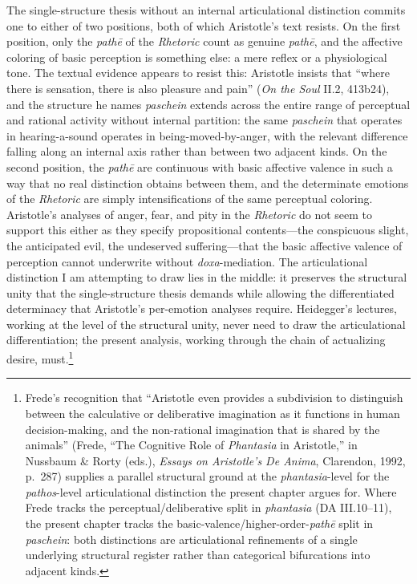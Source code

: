 \documentclass{article}
\begin{document}
The single-structure thesis without an internal articulational distinction commits one to either of two positions, both of which Aristotle's text resists. On the first position, only the \textit{pathē} of the \textit{Rhetoric} count as genuine \textit{pathē}, and the affective coloring of basic perception is something else: a mere reflex or a physiological tone. The textual evidence appears to resist this: Aristotle insists that ``where there is sensation, there is also pleasure and pain'' (\textit{On the Soul} II.2, 413b24), and the structure he names \textit{paschein} extends across the entire range of perceptual and rational activity without internal partition: the same \textit{paschein} that operates in hearing-a-sound operates in being-moved-by-anger, with the relevant difference falling along an internal axis rather than between two adjacent kinds. On the second position, the \textit{pathē} are continuous with basic affective valence in such a way that no real distinction obtains between them, and the determinate emotions of the \textit{Rhetoric} are simply intensifications of the same perceptual coloring. Aristotle's analyses of anger, fear, and pity in the \textit{Rhetoric} do not seem to support this either as they specify propositional contents---the conspicuous slight, the anticipated evil, the undeserved suffering---that the basic affective valence of perception cannot underwrite without \textit{doxa}-mediation. The articulational distinction I am attempting to draw lies in the middle: it preserves the structural unity that the single-structure thesis demands while allowing the differentiated determinacy that Aristotle's per-emotion analyses require. Heidegger's lectures, working at the level of the structural unity, never need to draw the articulational differentiation; the present analysis, working through the chain of actualizing desire, must.\footnote{Frede's recognition that ``Aristotle even provides a subdivision to distinguish between the calculative or deliberative imagination as it functions in human decision-making, and the non-rational imagination that is shared by the animals'' (Frede, ``The Cognitive Role of \textit{Phantasia} in Aristotle,'' in Nussbaum \& Rorty (eds.), \textit{Essays on Aristotle's De Anima}, Clarendon, 1992, p.~287) supplies a parallel structural ground at the \textit{phantasia}-level for the \textit{pathos}-level articulational distinction the present chapter argues for. Where Frede tracks the perceptual/deliberative split in \textit{phantasia} (DA III.10--11), the present chapter tracks the basic-valence/higher-order-\textit{pathē} split in \textit{paschein}: both distinctions are articulational refinements of a single underlying structural register rather than categorical bifurcations into adjacent kinds.}
\end{document}
